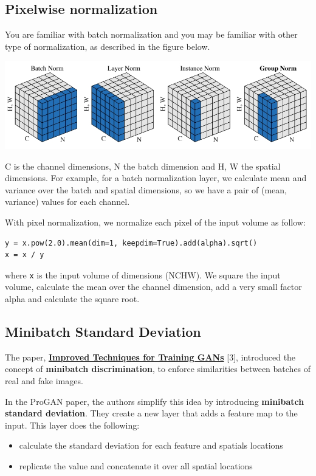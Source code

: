 \subsection{Pixelwise normalization}

You are familiar with batch normalization and you may be familiar with other type of normalization, as described in the figure below.

\includegraphics[width=1\linewidth]{img//genAdvNet//modernGAN/screenshot-from-2022-05-04-09-22-26.jpeg}

C is the channel dimensions, N the batch dimension and H, W the spatial dimensions. For example, for a batch normalization layer, we calculate mean and variance over the batch and spatial dimensions, so we have a pair of (mean, variance) values for each channel. \newline

With pixel normalization, we normalize each pixel of the input volume as follow:
\begin{lstlisting}
y = x.pow(2.0).mean(dim=1, keepdim=True).add(alpha).sqrt() 
x = x / y
\end{lstlisting}
where \lstinline|x| is the input volume of dimensions (NCHW). We square the input volume, calculate the mean over the channel dimension, add a very small factor alpha and calculate the square root.

\subsection{Minibatch Standard Deviation}
The paper, \href{https://arxiv.org/pdf/1606.03498.pdf}{\textbf{Improved Techniques for Training GANs}} [3], introduced the concept of \textbf{minibatch discrimination}, to enforce similarities between batches of real and fake images. \newline

In the ProGAN paper, the authors simplify this idea by introducing \textbf{minibatch standard deviation}. They create a new layer that adds a feature map to the input. This layer does the following:
\begin{itemize}
    \item calculate the standard deviation for each feature and spatials locations
    \item replicate the value and concatenate it over all spatial locations
\end{itemize}

